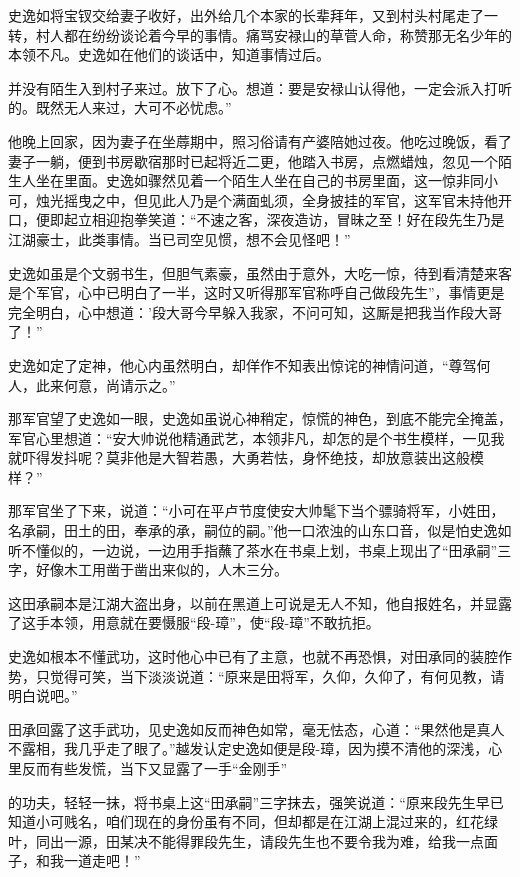\documentclass[12pt,oneside]{book}
\begin{document}
史逸如将宝钗交给妻子收好，出外给几个本家的长辈拜年，又到村头村尾走了一转，村人都在纷纷谈论着今早的事情。痛骂安禄山的草菅人命，称赞那无名少年的本领不凡。史逸如在他们的谈话中，知道事情过后。

并没有陌生入到村子来过。放下了心。想道：要是安禄山认得他，一定会派入打听的。既然无人来过，大可不必忧虑。''

他晚上回家，因为妻子在坐蓐期中，照习俗请有产婆陪她过夜。他吃过晚饭，看了妻子一躺，便到书房歇宿那时已起将近二更，他踏入书房，点燃蜡烛，忽见一个陌生人坐在里面。史逸如骤然见着一个陌生人坐在自己的书房里面，这一惊非同小可，烛光摇曳之中，但见此人乃是个满面虬须，全身披挂的军官，这军官未持他开口，便即起立相迎抱拳笑道：``不速之客，深夜造访，冒昧之至！好在段先生乃是江湖豪士，此类事情。当已司空见惯，想不会见怪吧！''

史逸如虽是个文弱书生，但胆气素豪，虽然由于意外，大吃一惊，待到看清楚来客是个军官，心中已明白了一半，这时又听得那军官称呼自己做段先生''，事情更是完全明白，心中想道：'段大哥今早躲入我家，不问可知，这厮是把我当作段大哥了！''

史逸如定了定神，他心内虽然明白，却佯作不知表出惊诧的神情问道，``尊驾何人，此来何意，尚请示之。''

那军官望了史逸如一眼，史逸如虽说心神稍定，惊慌的神色，到底不能完全掩盖，军官心里想道：``安大帅说他精通武艺，本领非凡，却怎的是个书生模样，一见我就吓得发抖呢？莫非他是大智若愚，大勇若怯，身怀绝技，却放意装出这般模样？''

那军官坐了下来，说道：``小可在平卢节度使安大帅髦下当个骠骑将军，小姓田，名承嗣，田土的田，奉承的承，嗣位的嗣。''他一口浓浊的山东口音，似是怕史逸如听不懂似的，一边说，一边用手指蘸了茶水在书桌上划，书桌上现出了``田承嗣''三字，好像木工用凿于凿出来似的，人木三分。

这田承嗣本是江湖大盗出身，以前在黑道上可说是无人不知，他自报姓名，并显露了这手本领，用意就在要慑服``段-璋''，使``段-璋''不敢抗拒。

史逸如根本不懂武功，这时他心中已有了主意，也就不再恐惧，对田承同的装腔作势，只觉得可笑，当下淡淡说道：``原来是田将军，久仰，久仰了，有何见教，请明白说吧。''

田承回露了这手武功，见史逸如反而神色如常，毫无怯态，心道：``果然他是真人不露相，我几乎走了眼了。''越发认定史逸如便是段-璋，因为摸不清他的深浅，心里反而有些发慌，当下又显露了一手``金刚手''

的功夫，轻轻一抹，将书桌上这``田承嗣''三字抹去，强笑说道：``原来段先生早已知道小可贱名，咱们现在的身份虽有不同，但却都是在江湖上混过来的，红花绿叶，同出一源，田某决不能得罪段先生，请段先生也不要令我为难，给我一点面子，和我一道走吧！''
\end{document}
